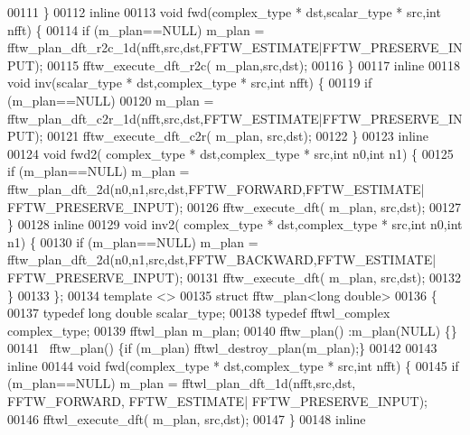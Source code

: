 \begin{DoxyCode}
00111       \}
00112       \textcolor{keyword}{inline}
00113       \textcolor{keywordtype}{void} fwd(complex\_type * dst,scalar\_type * src,\textcolor{keywordtype}{int} nfft) \{
00114           \textcolor{keywordflow}{if} (m\_plan==NULL) m\_plan = fftw\_plan\_dft\_r2c\_1d(nfft,src,dst,FFTW\_ESTIMATE|FFTW\_PRESERVE\_INPUT);
00115           fftw\_execute\_dft\_r2c( m\_plan,src,dst);
00116       \}
00117       \textcolor{keyword}{inline}
00118       \textcolor{keywordtype}{void} inv(scalar\_type * dst,complex\_type * src,\textcolor{keywordtype}{int} nfft) \{
00119           \textcolor{keywordflow}{if} (m\_plan==NULL)
00120               m\_plan = fftw\_plan\_dft\_c2r\_1d(nfft,src,dst,FFTW\_ESTIMATE|FFTW\_PRESERVE\_INPUT);
00121           fftw\_execute\_dft\_c2r( m\_plan, src,dst);
00122       \}
00123       \textcolor{keyword}{inline} 
00124       \textcolor{keywordtype}{void} fwd2( complex\_type * dst,complex\_type * src,\textcolor{keywordtype}{int} n0,\textcolor{keywordtype}{int} n1) \{
00125           \textcolor{keywordflow}{if} (m\_plan==NULL) m\_plan = fftw\_plan\_dft\_2d(n0,n1,src,dst,FFTW\_FORWARD,FFTW\_ESTIMATE|
      FFTW\_PRESERVE\_INPUT);
00126           fftw\_execute\_dft( m\_plan, src,dst);
00127       \}
00128       \textcolor{keyword}{inline} 
00129       \textcolor{keywordtype}{void} inv2( complex\_type * dst,complex\_type * src,\textcolor{keywordtype}{int} n0,\textcolor{keywordtype}{int} n1) \{
00130           \textcolor{keywordflow}{if} (m\_plan==NULL) m\_plan = fftw\_plan\_dft\_2d(n0,n1,src,dst,FFTW\_BACKWARD,FFTW\_ESTIMATE|
      FFTW\_PRESERVE\_INPUT);
00131           fftw\_execute\_dft( m\_plan, src,dst);
00132       \}
00133   \};
00134   \textcolor{keyword}{template} <> 
00135   \textcolor{keyword}{struct }fftw\_plan<long double>
00136   \{
00137       \textcolor{keyword}{typedef} \textcolor{keywordtype}{long} \textcolor{keywordtype}{double} scalar\_type;
00138       \textcolor{keyword}{typedef} fftwl\_complex complex\_type;
00139       fftwl\_plan m\_plan;
00140       fftw\_plan() :m\_plan(NULL) \{\}
00141       ~fftw\_plan() \{\textcolor{keywordflow}{if} (m\_plan) fftwl\_destroy\_plan(m\_plan);\}
00142 
00143       \textcolor{keyword}{inline}
00144       \textcolor{keywordtype}{void} fwd(complex\_type * dst,complex\_type * src,\textcolor{keywordtype}{int} nfft) \{
00145           \textcolor{keywordflow}{if} (m\_plan==NULL) m\_plan = fftwl\_plan\_dft\_1d(nfft,src,dst, FFTW\_FORWARD, FFTW\_ESTIMATE|
      FFTW\_PRESERVE\_INPUT);
00146           fftwl\_execute\_dft( m\_plan, src,dst);
00147       \}
00148       \textcolor{keyword}{inline}

\end{DoxyCode}
